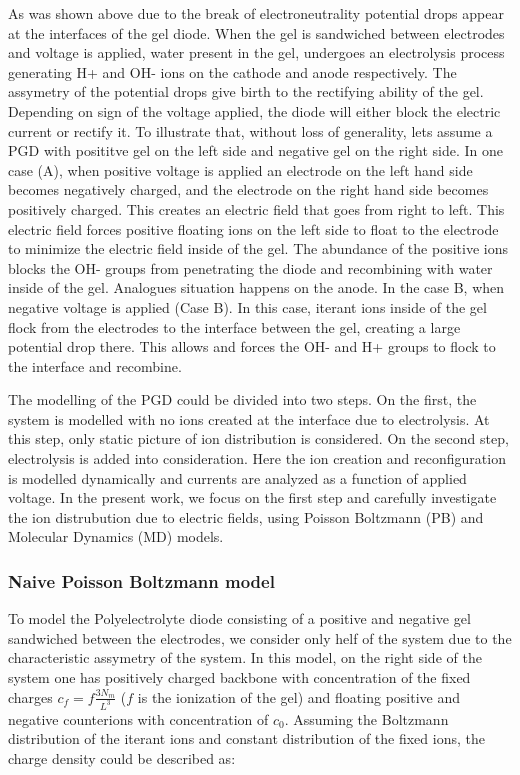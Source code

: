 \documentclass[twoside,twocolumn,9pt]{article}
\begin{document}
As was shown above due to the break of electroneutrality potential drops appear at the interfaces of the gel diode. When the gel is sandwiched between electrodes and voltage is applied, water present in the gel, undergoes an electrolysis process generating H+ and OH- ions on the cathode and anode respectively. The assymetry of the potential drops give birth to the rectifying ability of the gel. Depending on sign of the voltage applied, the diode will either block the electric current or rectify it. To illustrate that, without loss of generality, lets assume a PGD with posititve gel on the left side and negative gel on the right side. In one case (A), when positive voltage is applied an electrode on the left hand side becomes negatively charged, and the electrode on the right hand side becomes positively charged. This creates an electric field that goes from right to left. This electric field forces positive floating ions on the left side to float to the electrode to minimize the electric field inside of the gel. The abundance of the positive ions blocks the OH- groups from penetrating the diode and recombining with water inside of the gel. Analogues situation happens on the anode. In the case B, when negative voltage is applied (Case B). In this case, iterant ions inside of the gel flock from the electrodes  to the interface between the gel, creating a large potential drop there. This allows and forces the OH- and H+ groups to flock to the interface and recombine.

The modelling of the PGD could be divided into two steps. On the first, the system is modelled with no ions created at the interface due to electrolysis. At this step, only static picture of ion distribution is considered. On the second step, electrolysis is added into consideration. Here the ion creation and reconfiguration is modelled dynamically and currents are analyzed as a function of applied voltage. In the present work, we focus on the first step and carefully investigate the ion distrubution due to electric fields, using Poisson Boltzmann (PB) and Molecular Dynamics (MD) models. 
\subsubsection{Naive Poisson Boltzmann model}

To model the Polyelectrolyte diode consisting of a positive and negative gel sandwiched between the electrodes, we consider only helf of the system due to the characteristic assymetry of the system. In this model, on the right side of the system one has positively charged backbone with concentration of the fixed charges $c_f  = f \frac{3 N_m}{L^3}$ ($f$ is the ionization of the gel) and floating positive and negative counterions with concentration of $c_0$. Assuming the Boltzmann distribution of the iterant ions and constant distribution of the fixed ions, the charge density could be described as:  
\end{document}
